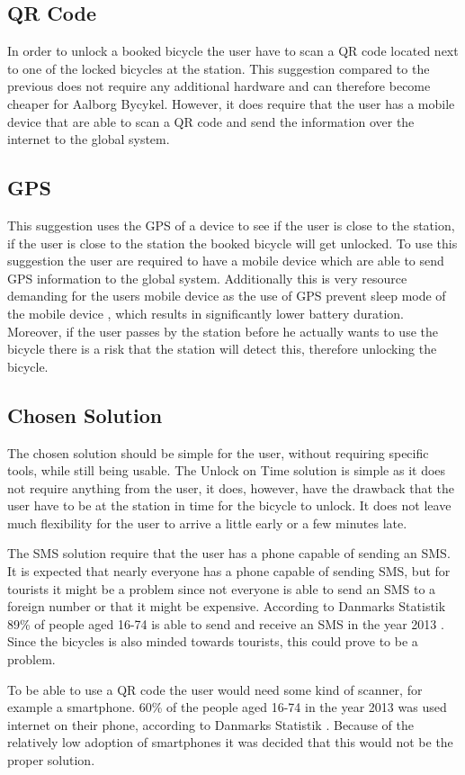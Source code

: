 \subsection{QR Code}
In order to unlock a booked bicycle the user have to scan a QR code located next to one of the locked bicycles at the station.
This suggestion compared to the previous does not require any additional hardware and can therefore become cheaper for Aalborg Bycykel.
However, it does require that the user has a mobile device that are able to scan a QR code and send the information over the internet to the global system.

\subsection{GPS}
This suggestion uses the GPS of a device to see if the user is close to the station, if the user is close to the station the booked bicycle will get unlocked.
To use this suggestion the user are required to have a mobile device which are able to send GPS information to the global system.
Additionally this is very resource demanding for the users mobile device as the use of GPS prevent sleep mode of the mobile device \citep{misc:gpsbatteryusage}, which results in significantly lower battery duration.
Moreover, if the user passes by the station before he actually wants to use the bicycle there is a risk that the station will detect this, therefore unlocking the bicycle.

\subsection{Chosen Solution}
The chosen solution should be simple for the user, without requiring specific tools, while still being usable.
The Unlock on Time solution is simple as it does not require anything from the user, it does, however, have the drawback that the user have to be at the station in time for the bicycle to unlock.
It does not leave much flexibility for the user to arrive a little early or a few minutes late.

The SMS solution require that the user has a phone capable of sending an SMS. 
It is expected that nearly everyone has a phone capable of sending SMS, but for tourists it might be a problem since not everyone is able to send an SMS to a foreign number or that it might be expensive.
According to Danmarks Statistik 89\% of people aged 16-74 is able to send and receive an SMS in the year 2013 \citep{misc:dstMobilephone}.
Since the bicycles is also minded towards tourists, this could prove to be a problem.

To be able to use a QR code the user would need some kind of scanner, for example a smartphone.
60\% of the people aged 16-74 in the year 2013 was used internet on their phone, according to Danmarks Statistik \citep{misc:dstMobilephone}.
Because of the relatively low adoption of smartphones it was decided that this would not be the proper solution.
